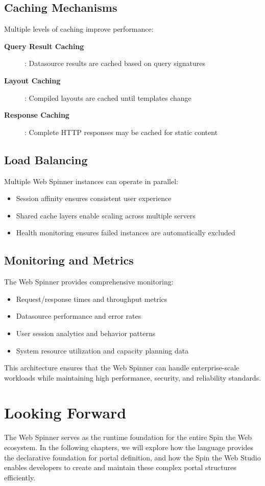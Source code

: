 \subsection{Caching Mechanisms}

Multiple levels of caching improve performance:
\begin{description}
    \item[\textbf{Query Result Caching}]: Datasource results are cached based on query signatures
    \item[\textbf{Layout Caching}]: Compiled layouts are cached until templates change
    \item[\textbf{Response Caching}]: Complete HTTP responses may be cached for static content
\end{description}

\subsection{Load Balancing}

Multiple Web Spinner instances can operate in parallel:
\begin{itemize}
    \item Session affinity ensures consistent user experience
    \item Shared cache layers enable scaling across multiple servers
    \item Health monitoring ensures failed instances are automatically excluded
\end{itemize}

\subsection{Monitoring and Metrics}

The Web Spinner provides comprehensive monitoring:
\begin{itemize}
    \item Request/response times and throughput metrics
    \item Datasource performance and error rates
    \item User session analytics and behavior patterns
    \item System resource utilization and capacity planning data
\end{itemize}

This architecture ensures that the Web Spinner can handle enterprise-scale workloads while maintaining high performance, security, and reliability standards.

\section{Looking Forward}
\label{sec:webspinner-forward}

The Web Spinner serves as the runtime foundation for the entire Spin the Web ecosystem. In the following chapters, we will explore how the \wbdl{} language provides the declarative foundation for portal definition, and how the Spin the Web Studio enables developers to create and maintain these complex portal structures efficiently.
